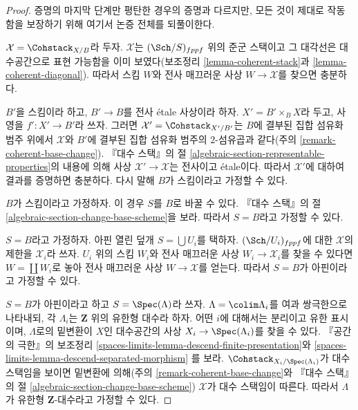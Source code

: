\begin{proof}
증명의 마지막 단계만 평탄한 경우의 증명과 다르지만, 모든 것이
제대로 작동함을 보장하기 위해 여기서 논증 전체를 되풀이한다.

\medskip\noindent
$\mathcal{X} = \Cohstack_{X/B}$라 두자. $\mathcal{X}$는
$(\Sch/S)_{fppf}$ 위의 준군 스택이고 그 대각선은 대수공간으로
표현 가능함을 이미 보였다(보조정리 \ref{lemma-coherent-stack}과
\ref{lemma-coherent-diagonal}). 따라서 스킴 $W$와 전사 매끄러운 사상
$W \to \mathcal{X}$를 찾으면 충분하다.

\medskip\noindent
$B'$을 스킴이라 하고, $B' \to B$를 전사 \'etale 사상이라 하자.
$X' = B' \times_B X$라 두고, 사영을 $f' : X' \to B'$라 쓰자.
그러면 $\mathcal{X}' = \Cohstack_{X'/B'}$는 $B$에 결부된 집합 섬유화 범주
위에서 $\mathcal{X}$와 $B'$에 결부된 집합 섬유화 범주의 $2$-섬유곱과
같다(주의 \ref{remark-coherent-base-change}). 『대수 스택』의 절
\ref{algebraic-section-representable-properties}의 내용에 의해 사상
$\mathcal{X}' \to \mathcal{X}$는 전사이고 \'etale이다.
따라서 $\mathcal{X}'$에 대하여 결과를 증명하면 충분하다.
다시 말해 $B$가 스킴이라고 가정할 수 있다.

\medskip\noindent
$B$가 스킴이라고 가정하자. 이 경우 $S$를 $B$로 바꿀 수 있다.
『대수 스택』의 절 \ref{algebraic-section-change-base-scheme}을 보라.
따라서 $S = B$라고 가정할 수 있다.

\medskip\noindent
$S = B$라고 가정하자. 아핀 열린 덮개 $S = \bigcup U_i$를 택하자.
$(\Sch/U_i)_{fppf}$에 대한 $\mathcal{X}$의 제한을 $\mathcal{X}_i$라 쓰자.
$U_i$ 위의 스킴 $W_i$와 전사 매끄러운 사상
$W_i \to \mathcal{X}_i$를 찾을 수 있다면 $W = \coprod W_i$로 놓아
전사 매끄러운 사상 $W \to \mathcal{X}$를 얻는다.
따라서 $S = B$가 아핀이라고 가정할 수 있다.

\medskip\noindent
$S = B$가 아핀이라고 하고 $S = \Spec(\Lambda)$라 쓰자.
$\Lambda = \colim \Lambda_i$를 여과 쌍극한으로 나타내되, 각 $\Lambda_i$는
$\mathbf{Z}$ 위의 유한형 대수라 하자. 어떤 $i$에 대해서는 분리이고
유한 표시이며, $\Lambda$로의 밑변환이 $X$인 대수공간의 사상
$X_i \to \Spec(\Lambda_i)$를 찾을 수 있다. 『공간의 극한』의 보조정리
\ref{spaces-limits-lemma-descend-finite-presentation}와
\ref{spaces-limits-lemma-descend-separated-morphism}
를 보라. $\Cohstack_{X_i/\Spec(\Lambda_i)}$가 대수 스택임을 보이면
밑변환에 의해(주의 \ref{remark-coherent-base-change}와 『대수 스택』의 절
\ref{algebraic-section-change-base-scheme}) $\mathcal{X}$가 대수 스택임이
따른다. 따라서 $\Lambda$가 유한형 $\mathbf{Z}$-대수라고 가정할 수 있다.


\end{proof}
